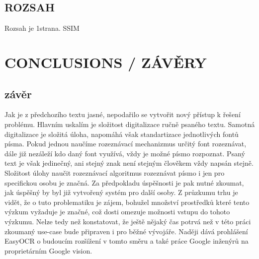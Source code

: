 \documentclass[journal]{IEEEtran}
\begin{document}
\subsection{ROZSAH}
Rozsah je 1strana. \ac{SSIM}



\section{CONCLUSIONS / ZÁVĚRY}
\subsection{závěr}
Jak je z předchozího textu jasné, nepodařilo se vytvořit nový přístup k řešení problému.
Hlavním uskalím je složitost digitalizace ručně psaného textu.
Samotná digitalizace je složitá úloha, napomáhá však standartizace jednotlivých fontů písma.
Pokud jednou naučíme rozeznávací mechanizmus určitý font rozeznávat, dále již nezáleží kdo daný font využívá, vždy je možné písmo rozpoznat.
Psaný text je však jedinečný, ani stejný znak není stejným člověkem vždy napsán stejně.
Složitost úlohy naučit rozeznávací algoritmus rozeznávat písmo i jen pro specifickou osobu je značná.
Za předpokladu úspěšnosti je pak nutné zkoumat, jak úspěšný by byl již vytvořený systém pro další osoby.
Z průzkumu trhu je vidět, že o tuto problematiku je zájem, bohužel množství prostředků které tento výzkum vyžaduje je značné, což dosti omezuje možnosti vstupu do tohoto výzkumu.
Nelze tedy než konstatovat, že ještě nějaký čas potrvá než v této práci zkoumaný use-case bude připraven i pro běžné vývojáře.
Naději dává prohlášení EasyOCR o budoucím rozšížení v tomto směru a také práce Google inženýrů na proprietárním Google vision.



\printbibliography

\printacronyms


\end{document}
